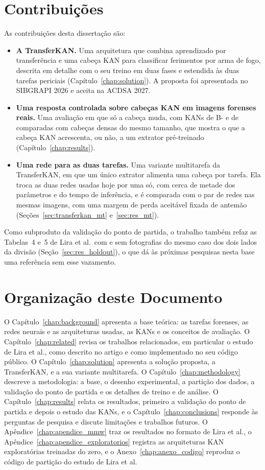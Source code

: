 \section{Contribuições}
\label{sec_contributions}

As contribuições desta dissertação são:
\begin{itemize}
    \item \textbf{A TransferKAN.} Uma arquitetura que combina aprendizado por transferência e uma cabeça KAN para classificar ferimentos por arma de fogo, descrita em detalhe com o seu treino em duas fases e estendida às duas tarefas periciais (Capítulo~\ref{chap:solution}). A proposta foi apresentada no SIBGRAPI 2026 e aceita na ACDSA 2027.
    \item \textbf{Uma resposta controlada sobre cabeças KAN em imagens forenses reais.} Uma avaliação em que só a cabeça muda, com KANs de B- e de  comparadas com cabeças densas do mesmo tamanho, que mostra o que a cabeça KAN acrescenta, ou não, a um extrator pré-treinado (Capítulo~\ref{chap:results}).
    \item \textbf{Uma rede para as duas tarefas.} Uma variante multitarefa da TransferKAN, em que um único extrator alimenta uma cabeça por tarefa. Ela troca as duas redes usadas hoje por uma só, com cerca de metade dos parâmetros e do tempo de inferência, e é comparada com o par de redes nas mesmas imagens, com uma margem de perda aceitável fixada de antemão (Seções~\ref{sec:transferkan_mt} e~\ref{sec:res_mt}).
\end{itemize}
Como subproduto da validação do ponto de partida, o trabalho também refaz as Tabelas~4 e~5 de Lira et al.\ com e sem fotografias do mesmo caso dos dois lados da divisão (Seção~\ref{sec:res_holdout}), o que dá às próximas pesquisas nesta base uma referência sem esse vazamento.

\section{Organização deste Documento}
\label{sec_about}

O Capítulo~\ref{chap:background} apresenta a base teórica: as tarefas forenses, as redes neurais e as arquiteturas usadas, as KANs e os conceitos de avaliação. O Capítulo~\ref{chap:related} revisa os trabalhos relacionados, em particular o estudo de Lira et al., como descrito no artigo e como implementado no seu código público. O Capítulo~\ref{chap:solution} apresenta a solução proposta, a TransferKAN, e a sua variante multitarefa. O Capítulo~\ref{chap:methodology} descreve a metodologia: a base, o desenho experimental, a partição dos dados, a validação do ponto de partida e os detalhes de treino e de análise. O Capítulo~\ref{chap:results} relata os resultados, primeiro a validação do ponto de partida e depois o estudo das KANs, e o Capítulo~\ref{chap:conclusions} responde às perguntas de pesquisa e discute limitações e trabalhos futuros. O Apêndice~\ref{chap:apendice_mmw} traz os resultados no formato de Lira et al., o Apêndice~\ref{chap:apendice_exploratorios} registra as arquiteturas KAN exploratórias treinadas do zero, e o Anexo~\ref{chap:anexo_codigo} reproduz o código de partição do estudo de Lira et al.
